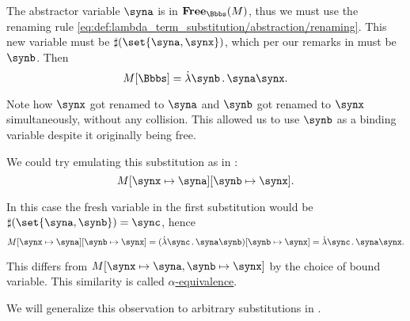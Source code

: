\begin{example}
\begin{thmenum}
    The abstractor variable \( \syna \) is in \( \op*{Free}_\Bbbs(M) \), thus we must use the renaming rule \eqref{eq:def:lambda_term_substitution/abstraction/renaming}. This new variable must be \( \sharp(\set{ \syna, \synx }) \), which per our remarks in  must be \( \synb \). Then
    \begin{equation*}
      M[\Bbbs] = \qabs \synb \syna \synx.
    \end{equation*}

    Note how \( \synx \) got renamed to \( \syna \) and \( \synb \) got renamed to \( \synx \) simultaneously, without any collision. This allowed us to use \( \synb \) as a binding variable despite it originally being free.

    We could try emulating this substitution as in :
    \begin{equation*}
      M[\synx \mapsto \syna][\synb \mapsto \synx].
    \end{equation*}

    In this case the fresh variable in the first substitution would be \( \sharp(\set{ \syna, \synb }) = \sync \), hence
    \begin{equation*}
      M[\synx \mapsto \syna][\synb \mapsto \synx]
      =
      (\qabs \sync \syna \synb)[\synb \mapsto \synx]
      =
      \qabs \sync \syna \synx.
    \end{equation*}

    This differs from \( M[\synx \mapsto \syna, \synb \mapsto \synx] \) by the choice of bound variable. This similarity is called \hyperref[def:lambda_term_alpha_equivalence]{\( \alpha \)-equivalence}.

    We will generalize this observation to arbitrary substitutions in .
  \end{thmenum}
\end{example}
